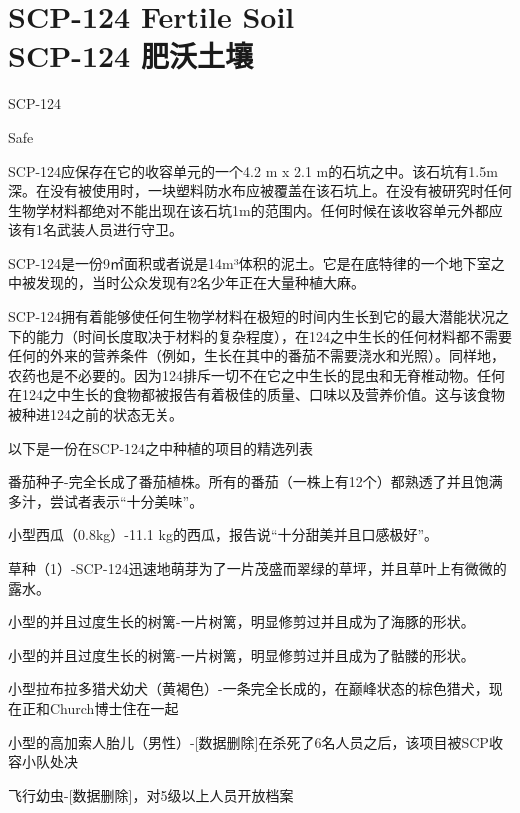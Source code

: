 \chapter[SCP-124 肥沃土壤]{
    SCP-124 Fertile Soil\\
    SCP-124 肥沃土壤
}

\label{chap:SCP-124}

SCP-124

Safe

SCP-124应保存在它的收容单元的一个4.2 m x 2.1 m的石坑之中。该石坑有1.5m深。在没有被使用时，一块塑料防水布应被覆盖在该石坑上。在没有被研究时任何生物学材料都绝对不能出现在该石坑1m的范围内。任何时候在该收容单元外都应该有1名武装人员进行守卫。

SCP-124是一份9㎡面积或者说是14m³体积的泥土。它是在底特律的一个地下室之中被发现的，当时公众发现有2名少年正在大量种植大麻。

SCP-124拥有着能够使任何生物学材料在极短的时间内生长到它的最大潜能状况之下的能力（时间长度取决于材料的复杂程度），在124之中生长的任何材料都不需要任何的外来的营养条件（例如，生长在其中的番茄不需要浇水和光照）。同样地，农药也是不必要的。因为124排斥一切不在它之中生长的昆虫和无脊椎动物。任何在124之中生长的食物都被报告有着极佳的质量、口味以及营养价值。这与该食物被种进124之前的状态无关。


\begin{scpbox}

以下是一份在SCP-124之中种植的项目的精选列表


番茄种子-完全长成了番茄植株。所有的番茄（一株上有12个）都熟透了并且饱满多汁，尝试者表示“十分美味”。

小型西瓜（0.8kg）-11.1 kg的西瓜，报告说“十分甜美并且口感极好”。

草种（1）-SCP-124迅速地萌芽为了一片茂盛而翠绿的草坪，并且草叶上有微微的露水。

小型的并且过度生长的树篱-一片树篱，明显修剪过并且成为了海豚的形状。

小型的并且过度生长的树篱-一片树篱，明显修剪过并且成为了骷髅的形状。

小型拉布拉多猎犬幼犬（黄褐色）-一条完全长成的，在巅峰状态的棕色猎犬，现在正和Church博士住在一起

小型的高加索人胎儿（男性）-{[}数据删除]在杀死了6名人员之后，该项目被SCP收容小队处决

飞行幼虫-{[}数据删除]，对5级以上人员开放档案

\end{scpbox}
